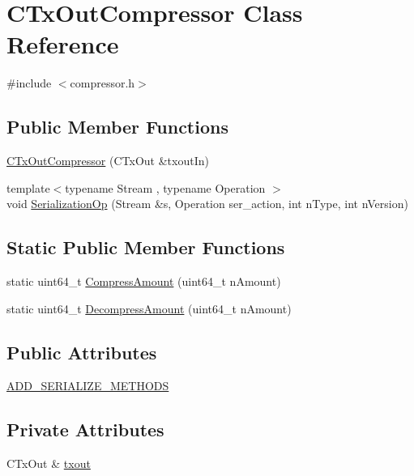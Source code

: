 \hypertarget{class_c_tx_out_compressor}{}\section{C\+Tx\+Out\+Compressor Class Reference}
\label{class_c_tx_out_compressor}


{\ttfamily \#include $<$compressor.\+h$>$}

\subsection*{Public Member Functions}
\begin{DoxyCompactItemize}
\item 
\mbox{\hyperlink{class_c_tx_out_compressor_a38ef1033989cd003de65598620d15cea}{C\+Tx\+Out\+Compressor}} (C\+Tx\+Out \&txout\+In)
\item 
{\footnotesize template$<$typename Stream , typename Operation $>$ }\\void \mbox{\hyperlink{class_c_tx_out_compressor_aad933ec09f7d6a764bd49da399f9083b}{Serialization\+Op}} (Stream \&s, Operation ser\+\_\+action, int n\+Type, int n\+Version)
\end{DoxyCompactItemize}
\subsection*{Static Public Member Functions}
\begin{DoxyCompactItemize}
\item 
static uint64\+\_\+t \mbox{\hyperlink{class_c_tx_out_compressor_a4141cec8885a2da956abb79130c963a8}{Compress\+Amount}} (uint64\+\_\+t n\+Amount)
\item 
static uint64\+\_\+t \mbox{\hyperlink{class_c_tx_out_compressor_a97751249d6a23b2a2b7bbc1165973371}{Decompress\+Amount}} (uint64\+\_\+t n\+Amount)
\end{DoxyCompactItemize}
\subsection*{Public Attributes}
\begin{DoxyCompactItemize}
\item 
\mbox{\hyperlink{class_c_tx_out_compressor_a520b323886560ededcfe303c4672481e}{A\+D\+D\+\_\+\+S\+E\+R\+I\+A\+L\+I\+Z\+E\+\_\+\+M\+E\+T\+H\+O\+DS}}
\end{DoxyCompactItemize}
\subsection*{Private Attributes}
\begin{DoxyCompactItemize}
\item 
C\+Tx\+Out \& \mbox{\hyperlink{class_c_tx_out_compressor_a0cc5b4e0d80df37dcaa706624eddc2f1}{txout}}
\end{DoxyCompactItemize}


